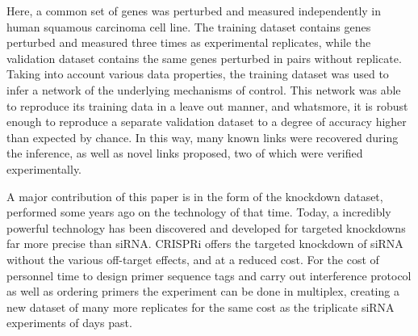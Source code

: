 Here, a common set of genes was perturbed and measured independently in human squamous carcinoma cell line. The training dataset contains genes perturbed and measured three times as experimental replicates, while the validation dataset contains the same genes perturbed in pairs without replicate. Taking into account various data properties, the training dataset was used to infer a network of the underlying mechanisms of control. This network was able to reproduce its training data in a leave out manner, and whatsmore, it is robust enough to reproduce a separate validation dataset to a degree of accuracy higher than expected by chance. In this way, many known links were recovered during the inference, as well as novel links proposed, two of which were verified experimentally. 

A major contribution of this paper is in the form of the knockdown dataset, performed some years ago on the technology of that time. Today, a incredibly powerful technology has been discovered and developed for targeted knockdowns far more precise than siRNA. CRISPRi offers the targeted knockdown of siRNA without the various off-target effects, and at a reduced cost. For the cost of personnel time to design primer sequence tags and carry out interference protocol as well as ordering primers the experiment can be done in multiplex, creating a new dataset of many more replicates for the same cost as the triplicate siRNA experiments of days past.




